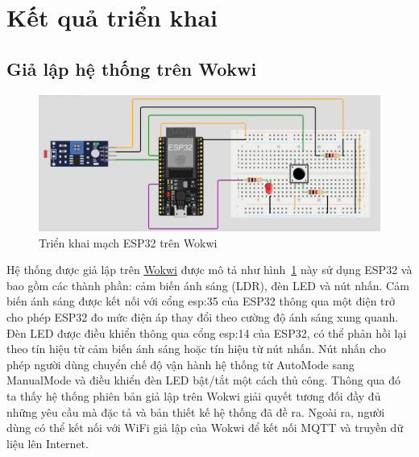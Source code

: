 {\pagebreak
\section{Kết quả triển khai}
\subsection{Giả lập hệ thống trên Wokwi}
\begin{figure}[H]
    \centering
    \includegraphics[width=1\linewidth]{img/Tinkercad.png}
    \caption{Triển khai mạch ESP32 trên Wokwi}
    \label{fig:tinkercad}
\end{figure}

Hệ thống được giả lập trên \href{https://wokwi.com/projects/418228728977255425}{Wokwi} được mô tả như hình~\ref{fig:tinkercad} này sử dụng ESP32 và bao gồm các thành phần: cảm biến ánh sáng (LDR), đèn LED và nút nhấn. Cảm biến ánh sáng được kết nối với cổng esp:35 của ESP32 thông qua một điện trở cho phép ESP32 đo mức điện áp thay đổi theo cường độ ánh sáng xung quanh. Đèn LED được điều khiển thông qua cổng esp:14 của ESP32, có thể phản hồi lại theo tín hiệu từ cảm biến ánh sáng hoặc tín hiệu từ nút nhấn. Nút nhấn cho phép người dùng chuyển chế độ vận hành hệ thống từ AutoMode sang ManualMode và điều khiển đèn LED bật/tắt một cách thủ công. Thông qua đó ta thấy hệ thống phiên bản giả lập trên Wokwi giải quyết tương đối đầy đủ những yêu cầu mà đặc tả và bản thiết kế hệ thống đã đề ra. Ngoài ra, người dùng có thể kết nối với WiFi giả lập của Wokwi để kết nối MQTT và truyền dữ liệu lên Internet.  


\pagebreak
}
